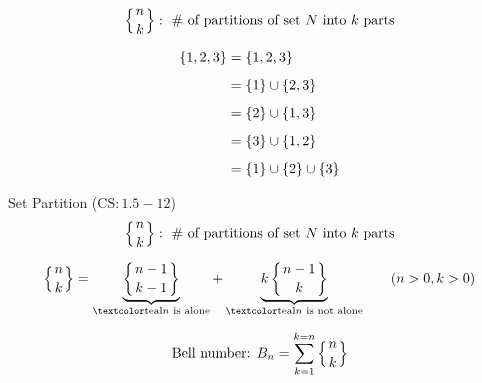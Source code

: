 
\begin{frame}{}
  \[
    \left\{ n \atop k \right\}: \text{ \# of partitions of set $N$ into $k$ parts}
  \]

  \begin{align*}
    \{1, 2, 3\} &= \{1, 2, 3\} \\[5pt]
                  &= \{1\} \cup \{2, 3\}  \\[5pt]
                  &= \{2\} \cup \{1, 3\}  \\[5pt]
                  &= \{3\} \cup \{1, 2\}  \\[5pt]
                  &= \{1\} \cup \{2\} \cup \{3\}
  \end{align*}

  \begin{center}
  \end{center}
\end{frame}

\begin{frame}{}
  \begin{exampleblock}{Set Partition ($\text{CS}: 1.5-12$)}
    \[
      \left\{ n \atop k \right\}: \text{ \# of partitions of set $N$ into $k$ parts}
    \]
  \end{exampleblock}

  \pause
  \vspace{0.60cm}
  \[
    \setpartition{n}{k} = \underbrace{\setpartition{n-1}{k-1}}_{\text{\teal{$n$ is alone}}} 
      + \underbrace{k \setpartition{n-1}{k}}_{\text{\teal{$n$ is not alone}}} \qquad (n > 0, k > 0)
  \]

  \pause
  \vspace{0.50cm}
  \[
    \text{Bell number: } B_n = \sum_{k=1}^{k=n} \left\{ n \atop k \right\}
  \]
\end{frame}

% 
% 
